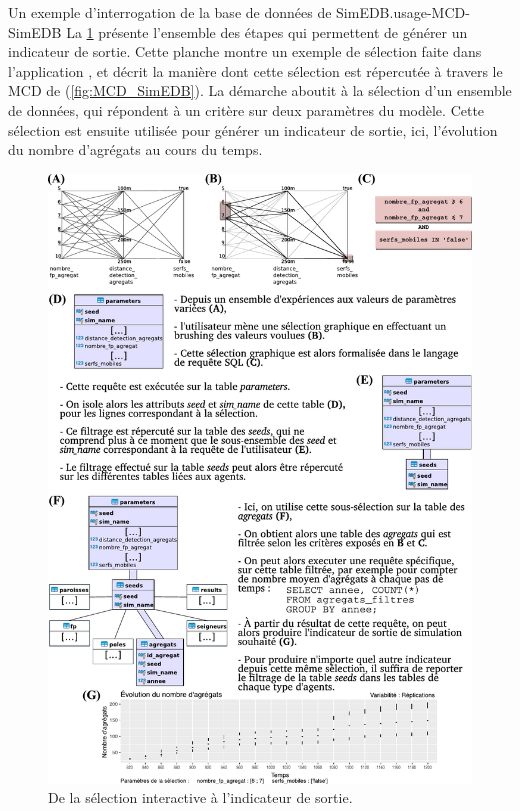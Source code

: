 \clearpage
\begin{encadre}{Un exemple d'interrogation de la base de données de SimEDB.}{usage-MCD-SimEDB}
	\renewcommand{\thempfootnote}{\alph{mpfootnote}}
	La \cref{fig:MCD_SimEDB_etapes} présente l'ensemble des étapes qui permettent de générer un indicateur de sortie.
	Cette planche montre un exemple de sélection faite dans l'application \simedb{}, et décrit la manière dont cette sélection est répercutée à travers le MCD de \simfeodal{} (\cref{fig:MCD_SimEDB}).
	La démarche aboutit à la sélection d'un ensemble de données, qui répondent à un critère sur deux paramètres du modèle.
	Cette sélection est ensuite utilisée pour générer un indicateur de sortie, ici, l'évolution du nombre d'agrégats au cours du temps.
	
	\begin{figure}[H]
		\centering
		\captionsetup{width=\linewidth}
		\includegraphics[width=.93\linewidth]{img/MCD_exemple_requetes_v2.pdf}
		\caption{De la sélection interactive à l'indicateur de sortie.}\vspace*{1em}
		\label{fig:MCD_SimEDB_etapes}
	\end{figure}
\end{encadre}

